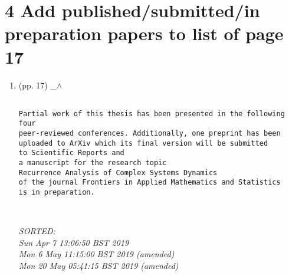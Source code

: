 \documentclass[12pt]{article}
\begin{document}
\section*{4 
Add published/submitted/in preparation papers to list of page 17
}



%


%
%
%

\begin{enumerate}

\item  (pp. 17)  \_$\wedge$  

	\begin{verbatim}	

Partial work of this thesis has been presented in the following four 
peer-reviewed conferences. Additionally, one preprint has been 
uploaded to ArXiv which its final version will be submitted 
to Scientific Reports and 
a manuscript for the research topic 
Recurrence Analysis of Complex Systems Dynamics
of the journal Frontiers in Applied Mathematics and Statistics
is in preparation. 



\end{verbatim}
	\textit{
	SORTED:  \\
	Sun Apr  7 13:06:50 BST 2019 \\
	Mon  6 May 11:15:00 BST 2019 (amended) \\
	Mon 20 May 05:41:15 BST 2019 (amended)
	}
	\\


\end{enumerate}


\end{document}

